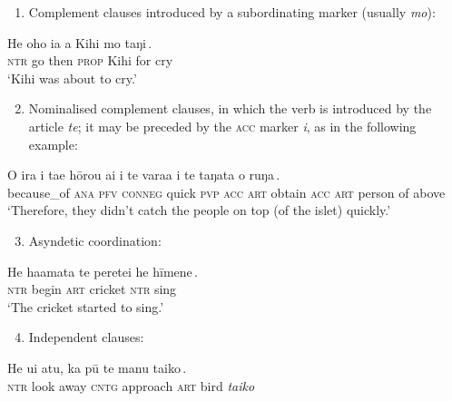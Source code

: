 \begin{enumerate}
\item 
Complement clauses introduced by a subordinating marker (usually \textit{mo}):
\end{enumerate}

\ea\label{ex:11.28}
\gll He oho ia a Kihi {\ob}mo taŋi\,{\cb}.\\
\textsc{ntr} go then \textsc{prop} Kihi {\db}for cry\\

\glt
‘Kihi was about to cry.’ \textstyleExampleref{[R215.024]} 
\z

\begin{enumerate}
\setcounter{enumi}{1}
\item 
Nominalised complement clauses, in which the verb is introduced by the article \textit{te}; it may be preceded by the \textsc{acc} marker \textit{i}, as in the following example:
\end{enumerate}

\ea\label{ex:11.29}
\gll {\ꞌ}O ira i ta{\ꞌ}e hōrou ai {\ob}i te vara{\ꞌ}a i te taŋata o ruŋa\,{\cb}. \\
because\_of \textsc{ana} \textsc{pfv} \textsc{conneg} quick \textsc{pvp} {\db}\textsc{acc} \textsc{art} obtain \textsc{acc} \textsc{art} person of above \\

\glt
‘Therefore, they didn’t catch the people on top (of the islet) quickly.’ \textstyleExampleref{[R304.048]} 
\z

\begin{enumerate}
\setcounter{enumi}{2}
\item 
Asyndetic coordination:
\end{enumerate}

\ea\label{ex:11.30}
\gll He ha{\ꞌ}amata te perete{\ꞌ}i {\ob}he hīmene\,{\cb}. \\
\textsc{ntr} begin \textsc{art} cricket {\db}\textsc{ntr} sing \\

\glt
‘The cricket started to sing.’ \textstyleExampleref{[R212.052]} 
\z

\begin{enumerate}
\setcounter{enumi}{3}
\item 
Independent clauses:
\end{enumerate}


\ea\label{ex:11.31}
\gll He u{\ꞌ}i atu, {\ob}ka pū te manu taiko\,{\cb}. \\
\textsc{ntr} look away {\db}\textsc{cntg} approach \textsc{art} bird \textit{taiko} \\

